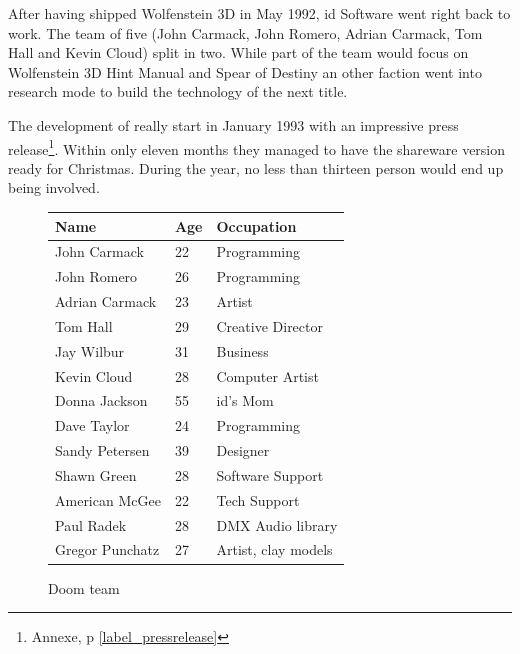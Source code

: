 After having shipped Wolfenstein 3D in May 1992, id Software went right back to work. The team of five (John Carmack, John Romero, Adrian Carmack, Tom Hall and Kevin Cloud) split in two. While part of the team would focus on Wolfenstein 3D Hint Manual and Spear of Destiny an other faction went into research mode to build the technology of the next title.\\
\par
The development of \doom really start in January 1993 with an impressive press release\protect\footnote{Annexe, p \ref{label_pressrelease}}. Within only eleven months they managed to have the shareware version ready for Christmas. During the year, no less than thirteen person would end up being involved.\\
\par
 \begin{figure}[H]
\centering  
\begin{tabularx}{\textwidth}{ X  X  X  }
  \toprule
  \textbf{Name} &  \textbf{Age} & \textbf{Occupation} \\
  \toprule 
   John Carmack & 22 &  Programming\\
   John Romero & 26 &  Programming\\
   Adrian Carmack & 23 &  Artist\\
   Tom Hall\protect\footnotemark  & 29 &  Creative Director\\
   Jay Wilbur & 31 &  Business\\
   Kevin Cloud& 28 &  Computer Artist\\
   Donna Jackson & 55 & id's Mom\\   
   Dave Taylor & 24 & Programming\\
   Sandy Petersen & 39 & Designer\\
   Shawn Green & 28 & Software Support\\
   American McGee & 22 & Tech Support\\
   Paul Radek & 28 & DMX Audio library\\
   Gregor Punchatz & 27 & Artist, clay models\\

     \toprule
\end{tabularx}
\caption{Doom team}\label{fig:Id Software team}
\end{figure}



